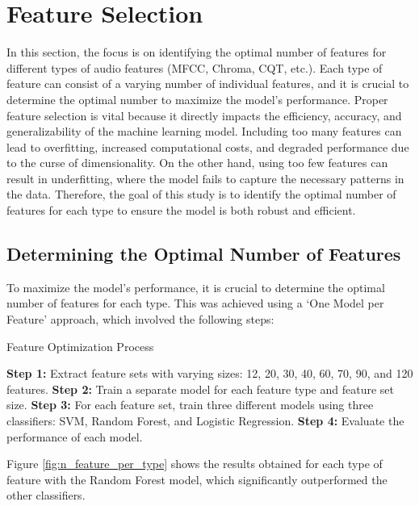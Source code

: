 \section{Feature Selection}
In this section, the focus is on identifying the optimal number of features for different types of audio features (MFCC, Chroma, CQT, etc.).
Each type of feature can consist of a varying number of individual features, and it is crucial to determine the optimal number to maximize
the model's performance. Proper feature selection is vital because it directly impacts the efficiency, accuracy,
and generalizability of the machine learning model. Including too many features can lead to overfitting, increased computational costs,
and degraded performance due to the curse of dimensionality. On the other hand, using too few features can result in underfitting,
where the model fails to capture the necessary patterns in the data. Therefore, the goal of this study is to identify the optimal number of features
for each type to ensure the model is both robust and efficient.

\subsection{Determining the Optimal Number of Features}

To maximize the model's performance, it is crucial to determine the optimal number of features for each type.
This was achieved using a `One Model per Feature' approach, which involved the following steps:

\begin{algorithm}
    \caption{Feature Optimization Process}
    \begin{algorithmic}[1]
        \State \textbf{Step 1:} Extract feature sets with varying sizes: 12, 20, 30, 40, 60, 70, 90, and 120 features.
        \State \textbf{Step 2:} Train a separate model for each feature type and feature set size.
        \State \textbf{Step 3:} For each feature set, train three different models using three classifiers: SVM, Random Forest,
        and Logistic Regression.
        \State \textbf{Step 4:} Evaluate the performance of each model.
    \end{algorithmic}
\end{algorithm}
\noindent
Figure \ref{fig:n_feature_per_type} shows the results obtained for each type of feature with the Random Forest model,
which significantly outperformed the other classifiers.


